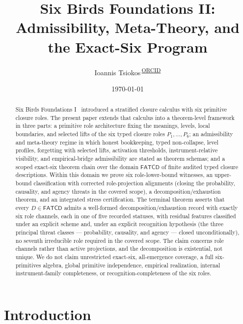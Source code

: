 \documentclass[11pt]{article}
\newcommand{\orcidlink}[1]{\textsuperscript{\href{https://orcid.org/#1}{ORCID}}}%
\theoremstyle{definition}
\newcommand{\FATCD}{\ensuremath{\mathsf{FATCD}}}
\begin{document}
\title{Six Birds Foundations II:\\[4pt]
Admissibility, Meta-Theory, and the Exact-Six Program}
\author{Ioannis Tsiokos\,\orcidlink{0009-0009-7659-5964}}
\date{\today}

\maketitle
\thispagestyle{firstpage}

\begin{abstract}
\noindent
Six Birds Foundations I~\citep{Tsiokos2026SixBirdsFoundations}
introduced a stratified closure calculus with six primitive closure
roles. The present paper extends that calculus
into a theorem-level framework in three parts: a primitive role
architecture fixing the meanings, levels, local boundaries, and
selected lifts of the six typed closure roles \(P_1,\ldots,P_6\); an
admissibility and meta-theory regime in which honest bookkeeping,
typed non-collapse, level profiles, forgetting with selected lifts,
activation thresholds, instrument-relative visibility, and
empirical-bridge admissibility are stated as theorem schemas; and a
scoped exact-six theorem chain over the domain \(\FATCD{}\) of finite
audited typed closure descriptions. Within this domain we prove six
role-lower-bound witnesses, an upper-bound classification with
corrected role-projection alignments (closing the probability,
causality, and agency threats in the covered scope), a
decomposition/exhaustion theorem, and an integrated stress
certification. The terminal theorem asserts that every
\(D \in \FATCD{}\) admits a well-formed decomposition/exhaustion
record with exactly six role channels, each in one of five recorded
statuses, with residual features classified under an explicit scheme
and, under an explicit recognition hypothesis (the three principal threat
classes --- probability, causality, and agency --- closed unconditionally), no
seventh irreducible role required in the covered scope. The
claim concerns role channels rather than active projections, and the
decomposition is existential, not unique. We do not claim unrestricted
exact-six, all-emergence coverage, a full six-primitives algebra,
global primitive independence, empirical realization, internal
instrument-family completeness, or recognition-completeness of the six roles.
\end{abstract}
 \section{Introduction}\label{sec:introduction}
\end{document}
